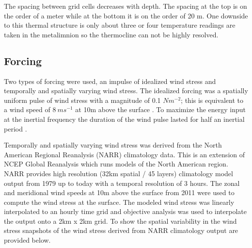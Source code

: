 The spacing between grid cells decreases with depth. The spacing at the top is on the order of a meter while at the bottom it is on the order of 20 m. One downside to
this thermal structure is only about three or four temperature readings are taken in the metalimnion so the thermocline can not be highly resolved.

\subsection{Forcing}

Two types of forcing were used, an impulse of idealized wind stress and temporally and spatially varying wind stress. The idealized forcing was a spatially 
uniform pulse of wind stress with a  magnitude of 0.1 $N m^{-2}$;  this is equivalent to a wind speed of $8\ ms^{-1}$ at 10m above the surface  \citep{fairall1996bulk}. 
 To maximize the energy input at the inertial frequency the duration of the wind pulse lasted for half an inertial period \citep{boyce1989thermal}.

Temporally and spatially varying wind stress was derived from the North American Regional Reanalysis (NARR) climatology data. This is an extension of NCEP Global
Reanalysis which runs models of the North American region. NARR provides high resolution (32km spatial / 45 layers) climatology model output from 1979 up to today 
with a temporal resolution of 3 hours. The zonal and meridional wind speeds at 10m above the surface from 2011 were used to compute the wind stress at  the surface. 
The modeled wind stress was linearly interpolated to an hourly time grid and objective analysis was used to interpolate the output onto a 2km x 2km grid. 
To show the spatial variability in the wind stress snapshots of the wind stress derived from NARR climatology output are provided below.


